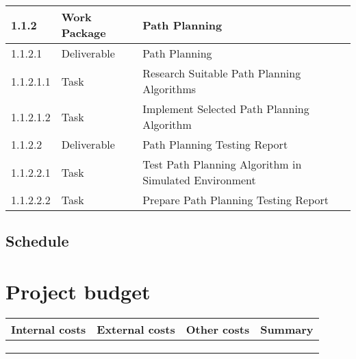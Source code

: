 \documentclass[10pt]{projectdoc}
\begin{document}
\begin{table}[H]
\begin{tabular}{|l|l|l|}
    1.1.2                & Work Package  & Path Planning                                              \\ \hline
    1.1.2.1              & Deliverable   & Path Planning                                              \\ \hline
    1.1.2.1.1            & Task          & Research Suitable Path Planning Algorithms                 \\ \hline
    1.1.2.1.2            & Task          & Implement Selected Path Planning Algorithm                 \\ \hline
    1.1.2.2              & Deliverable   & Path Planning Testing Report                               \\ \hline
    1.1.2.2.1            & Task          & Test Path Planning Algorithm in Simulated Environment      \\ \hline
    1.1.2.2.2            & Task          & Prepare Path Planning Testing Report                       \\ \hline
    \end{tabular}%
    \end{table}
\subsection{Schedule}



\section{Project budget}

\begin{table}[H]
    \begin{tabularx}{\columnwidth}{|X|X|X|X|}
        \hline
        Internal costs & External costs & Other costs & Summary \\ \hline
                       &                &             &         \\ \hline
                       &                &             &         \\ \hline
                       &                &             &         \\ \hline
\end{tabularx}
\end{table}
\end{document}
